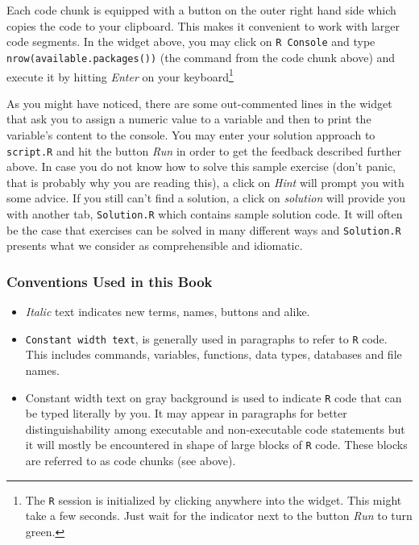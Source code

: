 \documentclass[]{book}
\let\rmarkdownfootnote\footnote%
\def\footnote{\protect\rmarkdownfootnote}
\theoremstyle{definition}
\theoremstyle{definition}
\theoremstyle{definition}
\theoremstyle{remark}
\begin{document}
Each code chunk is equipped with a button on the outer right hand side
which copies the code to your clipboard. This makes it convenient to
work with larger code segments. In the widget above, you may click on
\texttt{R Console} and type \texttt{nrow(available.packages())} (the
command from the code chunk above) and execute it by hitting
\emph{Enter} on your keyboard\footnote{The \texttt{R} session is
  initialized by clicking anywhere into the widget. This might take a
  few seconds. Just wait for the indicator next to the button \emph{Run}
  to turn green.}

As you might have noticed, there are some out-commented lines in the
widget that ask you to assign a numeric value to a variable and then to
print the variable's content to the console. You may enter your solution
approach to \texttt{script.R} and hit the button \emph{Run} in order to
get the feedback described further above. In case you do not know how to
solve this sample exercise (don't panic, that is probably why you are
reading this), a click on \emph{Hint} will prompt you with some advice.
If you still can't find a solution, a click on \emph{solution} will
provide you with another tab, \texttt{Solution.R} which contains sample
solution code. It will often be the case that exercises can be solved in
many different ways and \texttt{Solution.R} presents what we consider as
comprehensible and idiomatic.

\subsubsection*{Conventions Used in this
Book}\label{conventions-used-in-this-book}

\begin{itemize}
\item
  \emph{Italic} text indicates new terms, names, buttons and alike.
\item
  \texttt{Constant width text}, is generally used in paragraphs to refer
  to \texttt{R} code. This includes commands, variables, functions, data
  types, databases and file names.
\item
  Constant width text on gray background is used to indicate \texttt{R}
  code that can be typed literally by you. It may appear in paragraphs
  for better distinguishability among executable and non-executable code
  statements but it will mostly be encountered in shape of large blocks
  of \texttt{R} code. These blocks are referred to as code chunks (see
  above).
\end{itemize}
\end{document}
